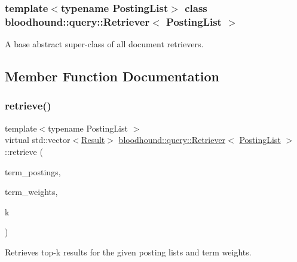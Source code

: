 \subsubsection*{template$<$typename Posting\+List$>$\newline
class bloodhound\+::query\+::\+Retriever$<$ Posting\+List $>$}

A base abstract super-\/class of all document retrievers. 

\subsection{Member Function Documentation}
\mbox{\label{classbloodhound_1_1query_1_1Retriever_ae3c6a4628c5580e620c213b3dcd47c2b}} 
\subsubsection{\texorpdfstring{retrieve()}{retrieve()}}
{\footnotesize\ttfamily template$<$typename Posting\+List $>$ \\
virtual std\+::vector$<$\hyperlink{structbloodhound_1_1query_1_1Result}{Result}$>$ \hyperlink{classbloodhound_1_1query_1_1Retriever}{bloodhound\+::query\+::\+Retriever}$<$ \hyperlink{classbloodhound_1_1PostingList}{Posting\+List} $>$\+::retrieve (\begin{DoxyParamCaption}\item[{const std\+::vector$<$ \hyperlink{classbloodhound_1_1PostingList}{Posting\+List} $>$ \&}]{term\+\_\+postings,  }\item[{const std\+::vector$<$ \hyperlink{structbloodhound_1_1Score}{Score} $>$ \&}]{term\+\_\+weights,  }\item[{std\+::size\+\_\+t}]{k }\end{DoxyParamCaption})\hspace{0.3cm}{\ttfamily [pure virtual]}}



Retrieves top-\/k results for the given posting lists and term weights. 



